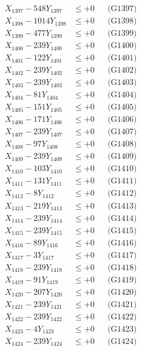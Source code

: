 \documentclass[a4paper,10pt]{article}
\begin{document}
{\begin{align}
X_{1397} - 548Y_{1397} &\leq +0 && \text{(G1397)} \\
X_{1398} - 1014Y_{1398} &\leq +0 && \text{(G1398)} \\
X_{1399} - 477Y_{1399} &\leq +0 && \text{(G1399)} \\
X_{1400} - 239Y_{1400} &\leq +0 && \text{(G1400)} \\
\allowbreak
X_{1401} - 122Y_{1401} &\leq +0 && \text{(G1401)} \\
X_{1402} - 239Y_{1402} &\leq +0 && \text{(G1402)} \\
X_{1403} - 239Y_{1403} &\leq +0 && \text{(G1403)} \\
X_{1404} - 81Y_{1404} &\leq +0 && \text{(G1404)} \\
X_{1405} - 151Y_{1405} &\leq +0 && \text{(G1405)} \\
X_{1406} - 171Y_{1406} &\leq +0 && \text{(G1406)} \\
X_{1407} - 239Y_{1407} &\leq +0 && \text{(G1407)} \\
X_{1408} - 97Y_{1408} &\leq +0 && \text{(G1408)} \\
X_{1409} - 239Y_{1409} &\leq +0 && \text{(G1409)} \\
X_{1410} - 103Y_{1410} &\leq +0 && \text{(G1410)} \\
\allowbreak
X_{1411} - 131Y_{1411} &\leq +0 && \text{(G1411)} \\
X_{1412} - 8Y_{1412} &\leq +0 && \text{(G1412)} \\
X_{1413} - 219Y_{1413} &\leq +0 && \text{(G1413)} \\
X_{1414} - 239Y_{1414} &\leq +0 && \text{(G1414)} \\
X_{1415} - 239Y_{1415} &\leq +0 && \text{(G1415)} \\
X_{1416} - 89Y_{1416} &\leq +0 && \text{(G1416)} \\
X_{1417} - 3Y_{1417} &\leq +0 && \text{(G1417)} \\
X_{1418} - 239Y_{1418} &\leq +0 && \text{(G1418)} \\
X_{1419} - 91Y_{1419} &\leq +0 && \text{(G1419)} \\
X_{1420} - 207Y_{1420} &\leq +0 && \text{(G1420)} \\
\allowbreak
X_{1421} - 239Y_{1421} &\leq +0 && \text{(G1421)} \\
X_{1422} - 239Y_{1422} &\leq +0 && \text{(G1422)} \\
X_{1423} - 4Y_{1423} &\leq +0 && \text{(G1423)} \\
X_{1424} - 239Y_{1424} &\leq +0 && \text{(G1424)} \\

\end{align}}
\end{document}
